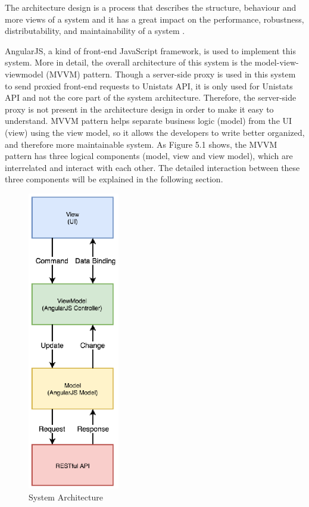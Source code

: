 The architecture design is a process that describes the structure, behaviour and more views of a system and it has a great impact on the performance, robustness, distributability, and maintainability of a system \cite{5_sommerville_2011}. 


AngularJS, a kind of front-end JavaScript framework, is used to implement this system. More in detail, the overall architecture of this system is the model-view-viewmodel (MVVM) pattern. Though a server-side proxy is used in this system to send proxied front-end requests to Unistats API, it is only used for Unistats API and not the core part of the system architecture. Therefore, the server-side proxy is not present in the architecture design in order to make it easy to understand. MVVM pattern helps separate business logic (model) from the UI (view) using the view model, so it allows the developers to write better organized, and therefore more maintainable system. As Figure 5.1 shows, the MVVM pattern has three logical components (model, view and view model), which are interrelated and interact with each other. The detailed interaction between these three components will be explained in the following section.
\begin{figure}[H]
  \centering
  \includegraphics[width=4cm]{./img/Picture7}
  \caption{System Architecture}
  \label{Figure:figex}
\end{figure}



